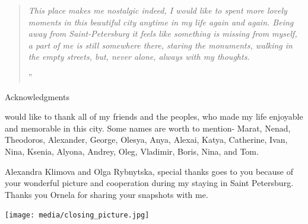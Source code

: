 \documentclass[10pt,a4paper]{article} %
\newcommand{\NewsItem}[1]{ %
\usefont{T1}{fvs}{n}{n} %
\vspace{24pt}\large #1\vspace{3pt} %
\par \normalsize \normalfont}
\begin{document}
\begin{multicols}{3}
\begin{quotation} %

\noindent\normalsize\textit{This place makes me nostalgic indeed, 
	I would like to spent more lovely moments in this beautiful city anytime in my life again and again. 
	Being away from Saint-Petersburg it feels like something is missing from myself, 
	a part of me is still somewhere there, staring the monuments, 
	walking in the empty streets, but, never alone, always with my thoughts.
}

\hfill{\Huge''}

\end{quotation}

\NewsItem{Acknowledgments}

 would like to thank all of my friends and the peoples, 
 who made my life enjoyable and memorable in this city. 
 Some names are worth to mention- Marat, Nenad, Theodoros, Alexander, George, Olesya, 
 Anya, Alexai, Katya, Catherine, Ivan, Nina, Ksenia, Alyona, Andrey, Oleg, Vladimir, 
 Boris, Nina, and Tom.

Alexandra Klimova and Olga Rybnytska, special thanks goes to you because of your 
wonderful picture and cooperation during my staying in Saint Petersburg. 
Thanks you Ornela for sharing your snapshots with me.

\end{multicols}


\begin{center}
	\vspace{10pt}
	\texttt{[image: media/closing\_picture.jpg]} %

	\vspace{10pt}
\end{center}
\end{document}
